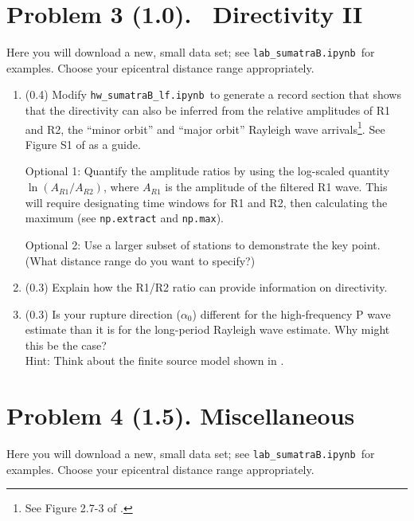\documentclass[11pt,titlepage,fleqn]{article}
\newcommand{\tfilelf}{{\tt hw\_sumatraB\_lf.ipynb}}
\newcommand{\tfilelab}{{\tt lab\_sumatraB.ipynb}}
\begin{document}
\section*{Problem 3 (1.0). \ptag\ Directivity II}

Here you will download a new, small data set; see \tfilelab\ for examples. Choose your epicentral distance range appropriately.

\begin{enumerate}
\item (0.4) Modify \tfilelf\ to generate a record section that shows that the directivity can also be inferred from the relative amplitudes of R1 and R2, the ``minor orbit'' and ``major orbit'' Rayleigh wave arrivals\footnote{See Figure 2.7-3 of \citet{SteinWysession}.}. See Figure S1 of \citet{Ammon2005} as a guide.

Optional 1: Quantify the amplitude ratios by using the log-scaled quantity $\ln(A_{R1}/A_{R2})$, where $A_{R1}$ is the amplitude of the filtered R1 wave. This will require designating time windows for R1 and R2, then calculating the maximum (see \verb+np.extract+ and \verb+np.max+).

Optional 2: Use a larger subset of stations to demonstrate the key point. (What distance range do you want to specify?)

\item (0.3) Explain how the R1/R2 ratio can provide information on directivity.

\item (0.3) Is your rupture direction ($\alpha_0$) different for the high-frequency P wave estimate than it is for the long-period Rayleigh wave estimate. Why might this be the case? \\
Hint: Think about the finite source model shown in .
\end{enumerate}


\section*{Problem 4 (1.5). Miscellaneous}

Here you will download a new, small data set; see \tfilelab\ for examples. Choose your epicentral distance range appropriately.
\end{document}
